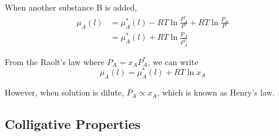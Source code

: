 \documentclass[letterpaper]{article}
\newcommand{\zero}{^\circ}
\begin{document}
When another substance B is added,
\begin{equation*}
    \begin{aligned}
        \mu_A(l) & =\mu_A^*(l)-RT\ln\frac{P_A^*}{P\zero}+RT\ln\frac{P_A}{P\zero} \\
                 & =\mu_A^*(l)+RT\ln\frac{P_A}{P_A^*}
    \end{aligned}
\end{equation*}

From the Raolt's law where $P_A=x_AP_A^*$, we can write
\begin{equation*}
    \mu_A(l)=\mu_A^*(l)+RT\ln x_A
\end{equation*}

However, when solution is dilute, $P_A\propto x_A$, which is known as Henry's law.

\subsection*{Colligative Properties}
\end{document}
